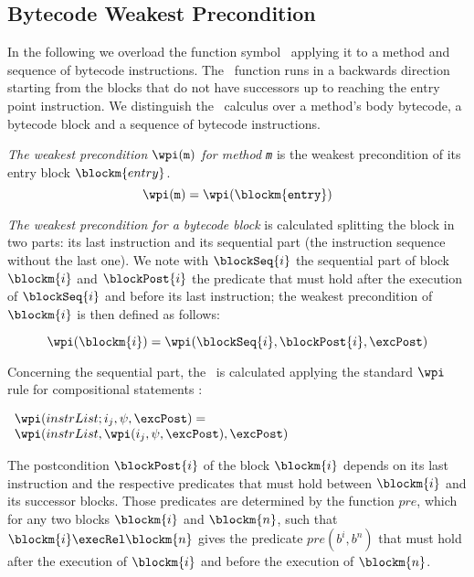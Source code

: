 \subsection{Bytecode Weakest Precondition}\label{wpGraph}

In the following we overload the function symbol \wpi \ applying it to a method and sequence of bytecode instructions.
The \wpi \ function runs in a backwards direction starting from the blocks that do not have successors up to reaching the entry point
 instruction. We distinguish the \wpi \ calculus over a method's body bytecode, a bytecode block and a sequence of 
 bytecode instructions.

{\it The weakest precondition $\wpi(\tt{m})$ for method \texttt{m}} is the weakest precondition of its entry block
 $\blockm{entry}$. 
 $$\wpi(\tt{m}) = \wpi(\blockm{entry})$$

{\it The weakest precondition for a bytecode block} is calculated splitting the block in two parts: its last instruction and
 its sequential part (the instruction sequence without the last one). We note with $\blockSeq{i}$ the sequential part of block
  $\blockm{i}$ and $\blockPost{i}$ the predicate that must hold after the execution of $\blockSeq{i}$ and before its last instruction; 
  the weakest precondition of $\blockm{i}$ is then defined as follows:

$$ \wpi(\blockm{i}) = \wpi( \blockSeq{i}, \blockPost{i}, \excPost ) $$

Concerning the sequential part, the \wpi \ is calculated applying the standard $\wpi$ rule for compositional statements :
\begin{center}
$ \begin{array}{l} \wpi( instrList;i_{j}, \psi,\excPost ) = \\ \wpi(instrList, \wpi(i_{j}, \psi,\excPost ),\excPost ) \end{array} $
\end{center}
The postcondition $\blockPost{i}$ of the block $\blockm{i}$ depends on its last instruction and the respective predicates 
that must hold between $\blockm{i}$ and its successor blocks. Those predicates are determined by the function $pre$, which for 
any two blocks $\blockm{i}$ and $\blockm{n}$, such that $\blockm{i} \execRel \blockm{n}$ gives the predicate $pre(b^{i}, b^{n})$ that must hold
after the execution of $\blockm{i}$ and before the execution of $\blockm{n}$. 

